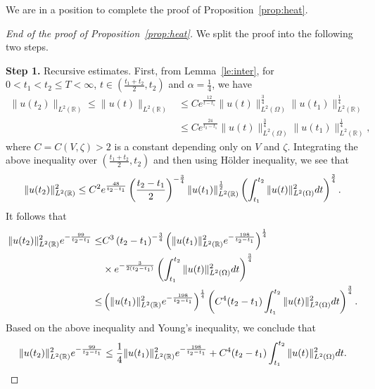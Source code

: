 \documentclass[a4paper,reqno]{amsart}
\theoremstyle{definition}
\numberwithin{equation}{section}
\newcommand{\R}{\mathbb{R}}
\def \R {{\mathbb{R} }}
\def \d {{\rm{d}}}
\begin{document}
    We are in a position to complete the proof of Proposition~\ref{prop:heat}.
    \begin{proof}
    [End of the proof of Proposition~\ref{prop:heat}]
    We split the proof into the following two steps.

\smallskip
    \textbf{Step 1.} Recursive estimates.
    First, from Lemma~\ref{le:inter}, for $0<t_{1}<t_{2}\le T<\infty$, $t\in \left(\frac{t_{1}+t_{2}}{2},t_{2}\right)$ and $\alpha=\frac{1}{4}$, we have 
    \begin{equation*}
    \begin{aligned}
        \|u(t_{2})\|_{L^{2}(\R)}\le \|u(t)\|_{L^{2}(\R)}
        &\le Ce^{\frac{12}{t-t_{1}}}\|u(t)\|_{L^{2}(\Omega)}^{\frac{3}{4}}\|u(t_{1})\|_{L^{2}(\R)}^{\frac{1}{4}}\\
        &\le Ce^{\frac{24}{t_{2}-t_{1}}}\|u(t)\|_{L^{2}(\Omega)}^{\frac{3}{4}}\|u(t_{1})\|_{L^{2}(\R)}^{\frac{1}{4}},
        \end{aligned}
    \end{equation*}
    where $C=C(V,\zeta)>2$ is a constant depending only on $V$ and $\zeta$. 
    Integrating the above inequality over $\left(\frac{t_{1}+t_{2}}{2},t_{2}\right)$ and then using H\"older inequality, we see that 
    \begin{equation*}
        \|u(t_{2})\|_{L^{2}(\R)}^{2}
        \le C^{2}e^{\frac{48}{t_{2}-t_{1}}}\left(\frac{t_{2}-t_{1}}{2}\right)^{-\frac{3}{4}}\|u(t_{1})\|_{L^{2}(\R)}^{\frac{1}{2}}\left(\int_{t_{1}}^{t_{2}}\|u(t)\|_{L^{2}(\Omega)}^{2}\d t\right)^{\frac{3}{4}}.
    \end{equation*}
    It follows that 
    \begin{equation*}
    \begin{aligned}
        \|u(t_{2})\|_{L^{2}(\R)}^{2}e^{-\frac{99}{t_{2}-t_{1}}}
        \le& C^{3} \left({t_{2}-t_{1}}\right)^{-\frac{3}{4}}\left(\|u(t_{1})\|_{L^{2}(\R)}^{2}e^{-\frac{198}{t_{2}-t_{1}}} \right)^{\frac{1}{4}}   \\
        &\times 
        e^{-\frac{3}{2(t_{2}-t_{1})}}\left(\int_{t_{1}}^{t_{2}}\|u(t)\|_{L^{2}(\Omega)}^{2}\d t\right)^{\frac{3}{4}}\\
        \le &\left(\|u(t_{1})\|_{L^{2}(\R)}^{2}e^{-\frac{198}{t_{2}-t_{1}}} \right)^{\frac{1}{4}}\left(C^{4}(t_{2}-t_{1})
        \int_{t_{1}}^{t_{2}}\|u(t)\|_{L^{2}(\Omega)}^{2}\d t        
        \right)^{\frac{3}{4}}.
        \end{aligned}
        \end{equation*}
        Based on the above inequality and Young's inequality, we conclude that 
        \begin{equation}\label{est:u2u1}
 \|u(t_{2})\|_{L^{2}(\R)}^{2}e^{-\frac{99}{t_{2}-t_{1}}}
 \le \frac{1}{4}\|u(t_{1})\|_{L^{2}(\R)}^{2}e^{-\frac{198}{t_{2}-t_{1}}}
 +
 C^{4}(t_{2}-t_{1})
        \int_{t_{1}}^{t_{2}}\|u(t)\|_{L^{2}(\Omega)}^{2}\d t.        
     \end{equation}


\end{proof}
\end{document}
